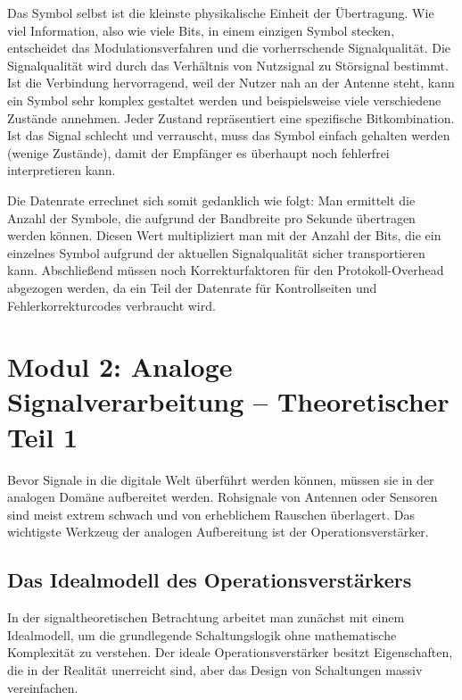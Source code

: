 \documentclass[11pt,a4paper]{article}
\begin{document}
Das Symbol selbst ist die kleinste physikalische Einheit der Übertragung. Wie viel Information, also wie viele Bits, in einem einzigen Symbol stecken, entscheidet das Modulationsverfahren und die vorherrschende Signalqualität. Die Signalqualität wird durch das Verhältnis von Nutzsignal zu Störsignal bestimmt. Ist die Verbindung hervorragend, weil der Nutzer nah an der Antenne steht, kann ein Symbol sehr komplex gestaltet werden und beispielsweise viele verschiedene Zustände annehmen. Jeder Zustand repräsentiert eine spezifische Bitkombination. Ist das Signal schlecht und verrauscht, muss das Symbol einfach gehalten werden (wenige Zustände), damit der Empfänger es überhaupt noch fehlerfrei interpretieren kann.

Die Datenrate errechnet sich somit gedanklich wie folgt: Man ermittelt die Anzahl der Symbole, die aufgrund der Bandbreite pro Sekunde übertragen werden können. Diesen Wert multipliziert man mit der Anzahl der Bits, die ein einzelnes Symbol aufgrund der aktuellen Signalqualität sicher transportieren kann. Abschließend müssen noch Korrekturfaktoren für den Protokoll-Overhead abgezogen werden, da ein Teil der Datenrate für Kontrollseiten und Fehlerkorrekturcodes verbraucht wird.

\newpage

\section{Modul 2: Analoge Signalverarbeitung -- Theoretischer Teil 1}

Bevor Signale in die digitale Welt überführt werden können, müssen sie in der analogen Domäne aufbereitet werden. Rohsignale von Antennen oder Sensoren sind meist extrem schwach und von erheblichem Rauschen überlagert. Das wichtigste Werkzeug der analogen Aufbereitung ist der Operationsverstärker.

\subsection{Das Idealmodell des Operationsverstärkers}

In der signaltheoretischen Betrachtung arbeitet man zunächst mit einem Idealmodell, um die grundlegende Schaltungslogik ohne mathematische Komplexität zu verstehen. Der ideale Operationsverstärker besitzt Eigenschaften, die in der Realität unerreicht sind, aber das Design von Schaltungen massiv vereinfachen.
\end{document}
